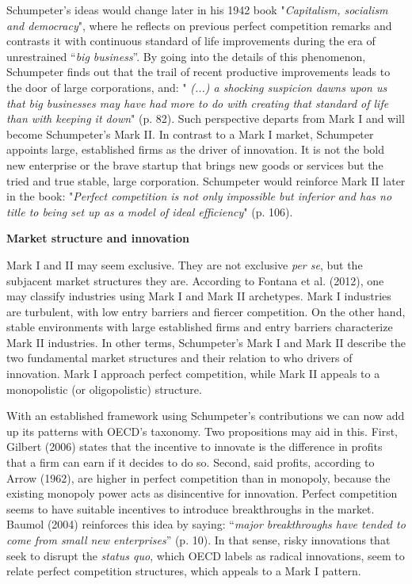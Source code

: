 \documentclass[12pt,a4paper]{article}
\begin{document}
Schumpeter's ideas would change later in his 1942 book "\textit{Capitalism, socialism and democracy}", where he reflects on previous perfect competition remarks and contrasts it with continuous standard of life improvements during the era of unrestrained “\textit{big business}”. By going into the details of this phenomenon, Schumpeter finds out that the trail of recent productive improvements leads to the door of large corporations, and: "\textit{ (...) a shocking suspicion dawns upon us that big businesses may have had more to do with creating that standard of life than with keeping it down}" (p. 82). Such perspective departs from Mark I and will become Schumpeter's Mark II. In contrast to a Mark I market, Schumpeter appoints large, established firms as the driver of innovation. It is not the bold new enterprise or the brave startup that brings new goods or services but the tried and true stable, large corporation. Schumpeter would reinforce Mark II later in the book: "\textit{Perfect competition is not only impossible but inferior and has no title to being set up as a model of ideal efficiency}" (p. 106).   

\noindent \textbf{Market structure and innovation }

Mark I and II may seem exclusive. They are not exclusive \textit{per se}, but the subjacent market structures they are. According to Fontana et al. (2012), one may classify industries using Mark I and Mark II archetypes. Mark I industries are turbulent, with low entry barriers and fiercer competition. On the other hand, stable environments with large established firms and entry barriers characterize Mark II industries. In other terms, Schumpeter's Mark I and Mark II describe the two fundamental market structures and their relation to who drivers of innovation. Mark I approach perfect competition, while Mark II appeals to a monopolistic (or oligopolistic) structure. 

With an established framework using Schumpeter's contributions we can now add up its patterns with OECD's taxonomy. Two propositions may aid in this. First, Gilbert (2006) states that the incentive to innovate is the difference in profits that a firm can earn if it decides to do so. Second, said profits, according to Arrow (1962), are higher in perfect competition than in monopoly, because the existing monopoly power acts as disincentive for innovation. Perfect competition seems to have suitable incentives to introduce breakthroughs in the market. Baumol (2004) reinforces this idea by saying: “\textit{major breakthroughs have tended to come from small new enterprises}” (p. 10). In that sense, risky innovations that seek to disrupt the \textit{status quo}, which OECD labels as radical innovations, seem to relate perfect competition structures, which appeals to a Mark I pattern.  
\end{document}
